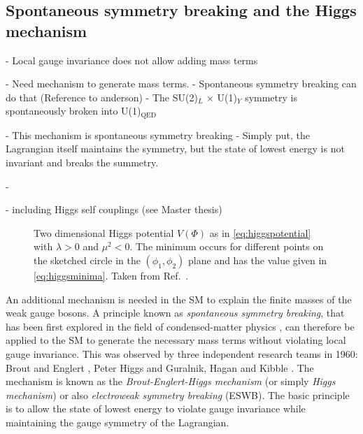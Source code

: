 \subsection{Spontaneous symmetry breaking and the Higgs mechanism}
\label{sec:ewsymbreaking}
- Local gauge invariance does not allow adding mass terms

- Need mechanism to generate mass terms.
- Spontaneous symmetry breaking can do that (Reference to anderson)
- The SU(2)$_L$ $\times$ U(1)$_Y$ symmetry is spontaneously broken into U(1)$_\text{QED}$

- This mechanism is spontaneous symmetry breaking
- Simply put, the Lagrangian itself maintains the symmetry, but the state of lowest energy is not invariant and breaks the summetry.

-





- including Higgs self couplings (see Master thesis)



\begin{figure}
  \caption[Two dimensional Higgs potential $V(\Phi)$ with $\lambda > 0$ and $\mu^2 < 0$.]{Two dimensional Higgs potential $V(\Phi)$ as in \cref{eq:higgspotential} with $\lambda > 0$ and $\mu^2 < 0$. The minimum occurs for different points on the sketched circle in the $(\phi_1, \phi_2)$ plane and has the value given in \cref{eq:higgsminima}. Taken from Ref.~\cite{Halzen:1984mc}.
  }
  \label{fig:higgspotential}
\end{figure}

An additional mechanism is needed in the SM to explain the finite masses of the weak gauge bosons. 
A principle known as \emph{spontaneous symmetry breaking}, that has been first explored in the field of condensed-matter physics , can therefore be applied to the SM to generate the necessary mass terms without violating local gauge invariance.
This was observed by three independent research teams in 1960: Brout and Englert \cite{PhysRevLett.13.321}, Peter Higgs \cite{PhysRevLett.13.508,HIGGS1964132} and Guralnik, Hagan and Kibble \cite{PhysRevLett.13.585}.
The mechanism is known as the \emph{Brout-Englert-Higgs mechanism} (or simply \emph{Higgs mechanism}) or also \emph{electroweak symmetry breaking} (ESWB).
The basic principle is to allow the state of lowest energy to violate gauge invariance while maintaining the gauge symmetry of the Lagrangian.

